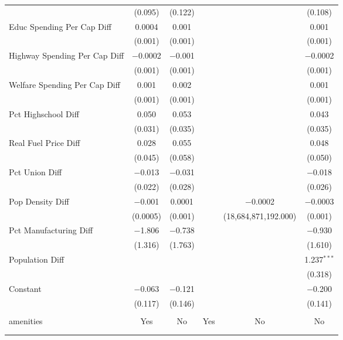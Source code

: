 \begin{table}[!htbp]
\begin{tabular}{@{\extracolsep{5pt}}lccccc}
  & (0.095) & (0.122) &  &  & (0.108) \\ 
  Educ Spending Per Cap Diff & 0.0004 & 0.001 &  &  & 0.001 \\ 
  & (0.001) & (0.001) &  &  & (0.001) \\ 
  Highway Spending Per Cap Diff & $-$0.0002 & $-$0.001 &  &  & $-$0.0002 \\ 
  & (0.001) & (0.001) &  &  & (0.001) \\ 
  Welfare Spending Per Cap Diff & 0.001 & 0.002 &  &  & 0.001 \\ 
  & (0.001) & (0.001) &  &  & (0.001) \\ 
  Pct Highschool Diff & 0.050 & 0.053 &  &  & 0.043 \\ 
  & (0.031) & (0.035) &  &  & (0.035) \\ 
  Real Fuel Price Diff & 0.028 & 0.055 &  &  & 0.048 \\ 
  & (0.045) & (0.058) &  &  & (0.050) \\ 
  Pct Union Diff & $-$0.013 & $-$0.031 &  &  & $-$0.018 \\ 
  & (0.022) & (0.028) &  &  & (0.026) \\ 
  Pop Density Diff & $-$0.001 & 0.0001 &  & $-$0.0002 & $-$0.0003 \\ 
  & (0.0005) & (0.001) &  & (18,684,871,192.000) & (0.001) \\ 
  Pct Manufacturing Diff & $-$1.806 & $-$0.738 &  &  & $-$0.930 \\ 
  & (1.316) & (1.763) &  &  & (1.610) \\ 
  Population Diff &  &  &  &  & 1.237$^{***}$ \\ 
  &  &  &  &  & (0.318) \\ 
  Constant & $-$0.063 & $-$0.121 &  &  & $-$0.200 \\ 
  & (0.117) & (0.146) &  &  & (0.141) \\ 
 \hline \\[-1.8ex] 
amenities & Yes & No & Yes & No & No \\ 
\hline \\[-1.8ex] 
\hline 
\hline \\[-1.8ex] 
\end{tabular} 
\end{table} 
